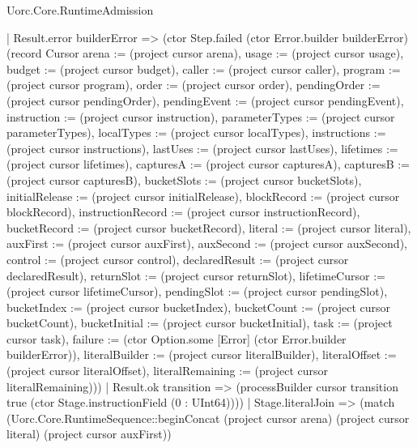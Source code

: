 \begin{lexlean}{Uorc.Core.RuntimeAdmission}
\begin{semanticmodule}
{        | Result.error builderError => (ctor Step.failed (ctor Error.builder builderError) (record Cursor {arena := (project cursor arena), usage := (project cursor usage), budget := (project cursor budget), caller := (project cursor caller), program := (project cursor program), order := (project cursor order), pendingOrder := (project cursor pendingOrder), pendingEvent := (project cursor pendingEvent), instruction := (project cursor instruction), parameterTypes := (project cursor parameterTypes), localTypes := (project cursor localTypes), instructions := (project cursor instructions), lastUses := (project cursor lastUses), lifetimes := (project cursor lifetimes), capturesA := (project cursor capturesA), capturesB := (project cursor capturesB), bucketSlots := (project cursor bucketSlots), initialRelease := (project cursor initialRelease), blockRecord := (project cursor blockRecord), instructionRecord := (project cursor instructionRecord), bucketRecord := (project cursor bucketRecord), literal := (project cursor literal), auxFirst := (project cursor auxFirst), auxSecond := (project cursor auxSecond), control := (project cursor control), declaredResult := (project cursor declaredResult), returnSlot := (project cursor returnSlot), lifetimeCursor := (project cursor lifetimeCursor), pendingSlot := (project cursor pendingSlot), bucketIndex := (project cursor bucketIndex), bucketCount := (project cursor bucketCount), bucketInitial := (project cursor bucketInitial), task := (project cursor task), failure := (ctor Option.some [Error] (ctor Error.builder builderError)), literalBuilder := (project cursor literalBuilder), literalOffset := (project cursor literalOffset), literalRemaining := (project cursor literalRemaining)}))
        | Result.ok transition => (processBuilder cursor transition true (ctor Stage.instructionField (0 : UInt64))))
      | Stage.literalJoin => (match (Uorc.Core.RuntimeSequence::beginConcat (project cursor arena) (project cursor literal) (project cursor auxFirst))
}
\end{semanticmodule}
\end{lexlean}
